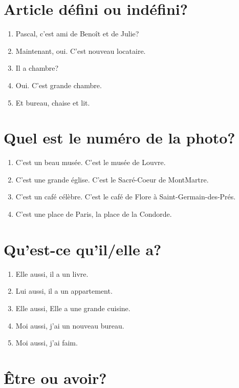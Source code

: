 \section{Article défini ou indéfini?}

\begin{enumerate}
    \item Pascal, c'est  ami de Benoît et de Julie?
    \item Maintenant, oui. C'est  nouveau locataire.
    \item Il a  chambre?
    \item Oui. C'est  grande chambre.
    \item Et  bureau,  chaise et  lit.
\end{enumerate}

\section{Quel est le numéro de la photo?}

\begin{enumerate}
    \item C'est un beau musée. C'est le musée de Louvre.
    \item C'est une grande église. C'est le Sacré-Coeur de MontMartre.
    \item C'est un café célèbre. C'est le café de Flore à Saint-Germain-des-Prés.
    \item C'est une place de Paris, la place de la Condorde.
\end{enumerate}

\section{Qu'est-ce qu'il/elle a?}

\begin{enumerate}
    \item Elle aussi, il a un livre.
    \item Lui aussi, il a un appartement.
    \item Elle aussi, Elle a une grande cuisine.
    \item Moi aussi, j'ai un nouveau bureau.
    \item Moi aussi, j'ai faim.
\end{enumerate}

\section{Être ou avoir?}

